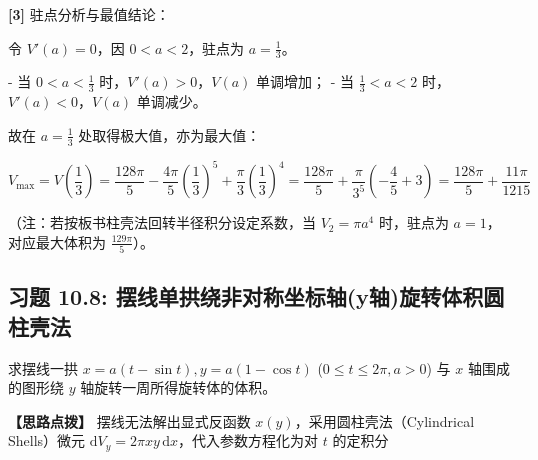 \documentclass[11pt,a4paper,UTF8]{ctexart}
\begin{document}
\begin{solbox}[分步推导与答题规范]
\textbf{[3]} 驻点分析与最值结论：

令 $V'(a) = 0$，因 $0 < a < 2$，驻点为 $a = \frac{1}{3}$。

- 当 $0 < a < \frac{1}{3}$ 时，$V'(a) > 0$，$V(a)$ 单调增加；
- 当 $\frac{1}{3} < a < 2$ 时，$V'(a) < 0$，$V(a)$ 单调减少。

故在 $a = \frac{1}{3}$ 处取得极大值，亦为最大值：


\begin{equation*}
V_{\max} = V\left(\frac{1}{3}\right) = \frac{128\pi}{5} - \frac{4\pi}{5}\left(\frac{1}{3}\right)^5 + \frac{\pi}{3}\left(\frac{1}{3}\right)^4 = \frac{128\pi}{5} + \frac{\pi}{3^5}\left(-\frac{4}{5} + 3\right) = \frac{128\pi}{5} + \frac{11\pi}{1215}
\end{equation*}


（注：若按板书柱壳法回转半径积分设定系数，当 $V_2 = \pi a^4$ 时，驻点为 $a = 1$，对应最大体积为 $\frac{129\pi}{5}$）。
\end{solbox}


\subsection{习题 10.8: 摆线单拱绕非对称坐标轴(y轴)旋转体积圆柱壳法}

求摆线一拱 $x = a(t - \sin t), y = a(1 - \cos t)$ ($0 \leqslant t \leqslant 2\pi, a > 0$) 与 $x$ 轴围成的图形绕 $y$ 轴旋转一周所得旋转体的体积。

\textbf{\color{DeepPurple}【思路点拨】} 摆线无法解出显式反函数 $x(y)$，采用圆柱壳法（Cylindrical Shells）微元 $\mathrm{d}V_y = 2\pi x y\,\mathrm{d}x$，代入参数方程化为对 $t$ 的定积分
\end{document}
